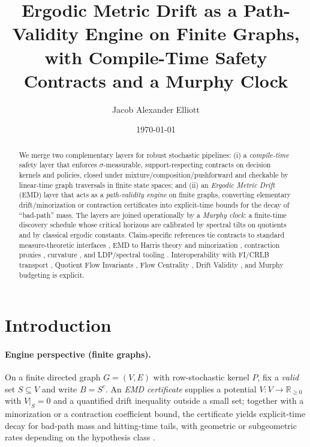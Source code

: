 \documentclass[11pt]{article}
\title{\textbf{Ergodic Metric Drift as a Path-Validity Engine on Finite Graphs,\\
with Compile-Time Safety Contracts and a Murphy Clock}}
\author{Jacob Alexander Elliott}
\date{\today}
\newcommand{\R}{\mathbb{R}}
\newcommand{\1}{\mathbbm{1}}
\begin{document}
\maketitle

\begin{abstract}
We merge two complementary layers for robust stochastic pipelines: (i) a \emph{compile-time} safety layer that enforces $\sigma$-measurable, support-respecting contracts on decision kernels and policies, closed under mixture/composition/pushforward and checkable by linear-time graph traversals in finite state spaces; and (ii) an \emph{Ergodic Metric Drift} (EMD) layer that acts as a \emph{path-validity engine} on finite graphs, converting elementary drift/minorization or contraction certificates into explicit-time bounds for the decay of ``bad-path'' mass. The layers are joined operationally by a \emph{Murphy clock}: a finite-time discovery schedule whose critical horizons are calibrated by spectral tilts on quotients and by classical ergodic constants. Claim-specific references tie contracts to standard measure-theoretic interfaces \parencite{Bogachev2007,AliprantisBorder2006}, EMD to Harris theory and minorization \parencite{MeynTweedie2009,Nummelin1984,RobertsRosenthal2004}, contraction proxies \parencite{LevinPeresWilmer2009,Seneta2006}, curvature \parencite{Ollivier2009,JoulinOllivier2010}, and LDP/spectral tooling \parencite{DemboZeitouni1998}. Interoperability with FI/CRLB transport \parencite{Blackwell1953,AmariNagaoka2000,Cencov1982}, Quotient Flow Invariants \parencite{elliott2025qfi}, Flow Centrality \parencite{elliott2025flow,Freeman1977,Newman2005}, Drift Validity \parencite{elliott2025drift}, and Murphy budgeting \parencite{elliott2025pmb} is explicit.
\end{abstract}

\section{Introduction}\label{sec:intro}
\paragraph{Engine perspective (finite graphs).}
On a finite directed graph $G=(V,E)$ with row-stochastic kernel $P$, fix a \emph{valid} set $S\subseteq V$ and write $B=S^c$. An \emph{EMD certificate} supplies a potential $V:V\to\R_{\ge 0}$ with $V|_S=0$ and a quantified drift inequality outside a small set; together with a minorization or a contraction coefficient bound, the certificate yields explicit-time decay for bad-path mass and hitting-time tails, with geometric or subgeometric rates depending on the hypothesis class \parencite{MeynTweedie2009,Nummelin1984,RobertsRosenthal2004,DoucFortMoulines2004,JarnerRoberts2002}.
\end{document}
